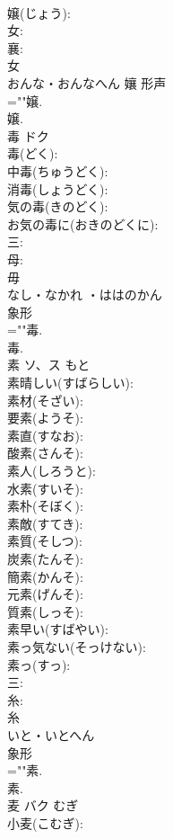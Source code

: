 \documentclass[8pt]{extreport}
\begin{document}
\begin{CJK}{UTF8}{min}
\\	嬢(じょう): 
\\	女: 
\\	襄: 
\\	女	
\\	おんな・おんなへん	孃	形声 
\\	=""嬢.
\\	嬢.
\\	毒	ドク			
\\	毒(どく): 
\\	中毒(ちゅうどく): 
\\	消毒(しょうどく): 
\\	気の毒(きのどく): 
\\	お気の毒に(おきのどくに): 
\\	三: 
\\	母: 
\\	毋	
\\	なし・なかれ ・ははのかん	
\\	象形 
\\	=""毒.
\\	毒.
\\	素	ソ、ス	もと		
\\	素晴しい(すばらしい): 
\\	素材(そざい): 
\\	要素(ようそ): 
\\	素直(すなお): 
\\	酸素(さんそ): 
\\	素人(しろうと): 
\\	水素(すいそ): 
\\	素朴(そぼく): 
\\	素敵(すてき): 
\\	素質(そしつ): 
\\	炭素(たんそ): 
\\	簡素(かんそ): 
\\	元素(げんそ): 
\\	質素(しっそ): 
\\	素早い(すばやい): 
\\	素っ気ない(そっけない): 
\\	素っ(すっ): 
\\	三: 
\\	糸: 
\\	糸	
\\	いと・いとへん	
\\	象形 
\\	=""素.
\\	素.
\\	麦	バク	むぎ		
\\	小麦(こむぎ): 

\end{CJK}
\end{document}
